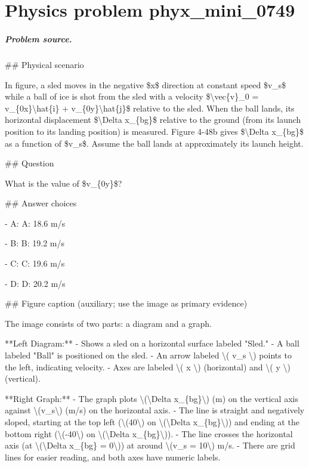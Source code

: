 
\chapter{Physics problem phyx\_mini\_0749}
\label{ch:PhyXMiniProblems_problem_phyx_mini_0749}

\paragraph{Problem source.}
\#\# Physical scenario

In figure, a sled moves in the negative \$x\$ direction at constant speed \$v\_s\$ while a ball of ice is shot from the sled with a velocity \$\textbackslash{}vec\{v\}\_0 = v\_\{0x\}\textbackslash{}hat\{i\} + v\_\{0y\}\textbackslash{}hat\{j\}\$ relative to the sled. When the ball lands, its horizontal displacement \$\textbackslash{}Delta x\_\{bg\}\$ relative to the ground (from its launch position to its landing position) is measured. Figure 4-48b gives \$\textbackslash{}Delta x\_\{bg\}\$ as a function of \$v\_s\$. Assume the ball lands at approximately its launch height.

\#\# Question

What is the value of \$v\_\{0y\}\$?

\#\# Answer choices

- A: A: 18.6 m/s

- B: B: 19.2 m/s

- C: C: 19.6 m/s

- D: D: 20.2 m/s

\#\# Figure caption (auxiliary; use the image as primary evidence)

The image consists of two parts: a diagram and a graph.

**Left Diagram:**
- Shows a sled on a horizontal surface labeled "Sled."
- A ball labeled "Ball" is positioned on the sled.
- An arrow labeled \textbackslash{}( v\_s \textbackslash{}) points to the left, indicating velocity.
- Axes are labeled \textbackslash{}( x \textbackslash{}) (horizontal) and \textbackslash{}( y \textbackslash{}) (vertical).

**Right Graph:**
- The graph plots \textbackslash{}(\textbackslash{}Delta x\_\{bg\}\textbackslash{}) (m) on the vertical axis against \textbackslash{}(v\_s\textbackslash{}) (m/s) on the horizontal axis.
- The line is straight and negatively sloped, starting at the top left (\textbackslash{}(40\textbackslash{}) on \textbackslash{}(\textbackslash{}Delta x\_\{bg\}\textbackslash{})) and ending at the bottom right (\textbackslash{}(-40\textbackslash{}) on \textbackslash{}(\textbackslash{}Delta x\_\{bg\}\textbackslash{})).
- The line crosses the horizontal axis (at \textbackslash{}(\textbackslash{}Delta x\_\{bg\} = 0\textbackslash{})) at around \textbackslash{}(v\_s = 10\textbackslash{}) m/s.
- There are grid lines for easier reading, and both axes have numeric labels.

